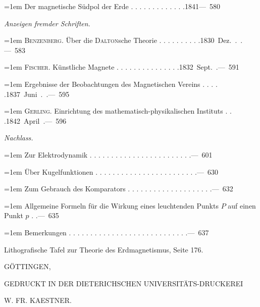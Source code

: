 \noindent\hangindent=1em Der magnetische Südpol der Erde . . . . . . . . . . . . .\unskip\hspace{1em plus 1fill}\mbox{1841\quad — 580}\par\smallskip
\par{}\medskip\noindent\textit{Anzeigen fremder Schriften.}\par\smallskip
\noindent\hangindent=1em \textsc{Benzenberg.} Über die \textsc{Dalton}sche Theorie . . . . . . . . . .\unskip\hspace{1em plus 1fill}\mbox{1830 Dez. . .\quad — 583}\par\smallskip
\noindent\hangindent=1em \textsc{Fischer.} Künstliche Magnete . . . . . . . . . . . . . . .\unskip\hspace{1em plus 1fill}\mbox{1832 Sept. .\quad — 591}\par\smallskip
\noindent\hangindent=1em Ergebnisse der Beobachtungen des Magnetischen Vereins . . . . .\unskip\hspace{1em plus 1fill}\mbox{1837 Juni . .\quad — 595}\par\smallskip
\noindent\hangindent=1em \textsc{Gerling.} Einrichtung des mathematisch-physikalischen Instituts . . .\unskip\hspace{1em plus 1fill}\mbox{1842 April .\quad — 596}\par\smallskip
\par{}\medskip\noindent\textit{Nachlass.}\par\smallskip
\noindent\hangindent=1em Zur Elektrodynamik . . . . . . . . . . . . . . . . . . . . . . . .\unskip\hspace{1em plus 1fill}\mbox{\quad — 601}\par\smallskip
\noindent\hangindent=1em Über Kugelfunktionen . . . . . . . . . . . . . . . . . . . . . . . .\unskip\hspace{1em plus 1fill}\mbox{\quad — 630}\par\smallskip
\noindent\hangindent=1em Zum Gebrauch des Komparators . . . . . . . . . . . . . . . . . . . .\unskip\hspace{1em plus 1fill}\mbox{\quad — 632}\par\smallskip
\noindent\hangindent=1em Allgemeine Formeln für die Wirkung eines leuchtenden Punkts $P$ auf einen Punkt $p$ . .\unskip\hspace{1em plus 1fill}\mbox{\quad — 635}\par\smallskip
\noindent\hangindent=1em Bemerkungen . . . . . . . . . . . . . . . . . . . . . . . . . . . .\unskip\hspace{1em plus 1fill}\mbox{\quad — 637}\par\smallskip
\par\medskip\noindent Lithografische Tafel zur Theorie des Erdmagnetismus, Seite 176.
\endgroup

\par\nopagebreak[4]\medskip\noindent\makebox[\linewidth][c]{\rule{.15\linewidth}{.35pt}}\par\nopagebreak[4]
\bigskip
\begin{center}
GÖTTINGEN,\par
\small GEDRUCKT IN DER DIETERICHSCHEN UNIVERSITÄTS-DRUCKEREI\par
W. FR. KAESTNER.
\end{center}
